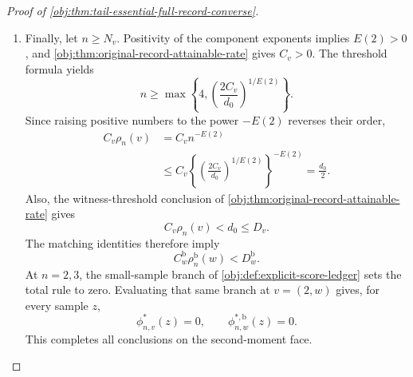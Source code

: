 \documentclass[11pt]{article}
\begin{document}
\begin{proof}[Proof of \cref{obj:thm:tail-essential-full-record-converse}]
\begin{enumerate}
\item
Finally, let \(n\ge N_v\). Positivity of the component exponents implies
\(E(2)>0\), and
\cref{obj:thm:original-record-attainable-rate} gives \(C_v>0\).
The threshold formula yields
\[
n\ge
\max\left\{4,\left(\frac{2C_v}{d_0}\right)^{1/E(2)}\right\}.
\]
Since raising positive numbers to the power \(-E(2)\) reverses their
order,
\[
\begin{aligned}
C_v\rho_n(v)
&=C_vn^{-E(2)}\\
&\le
C_v\left\{
\left(\frac{2C_v}{d_0}\right)^{1/E(2)}
\right\}^{-E(2)}
=\frac{d_0}{2}.
\end{aligned}
\]
Also, the witness-threshold conclusion of
\cref{obj:thm:original-record-attainable-rate} gives
\[
C_v\rho_n(v)<d_0\le D_v.
\]
The matching identities therefore imply
\[
C_w^{\mathrm b}\rho_n^{\mathrm b}(w)<D_w^{\mathrm b}.
\]
At \(n=2,3\), the small-sample branch of
\cref{obj:def:explicit-score-ledger} sets the total rule to zero.
Evaluating that same branch at \(v=(2,w)\) gives, for every sample \(z\),
\[
\phi^*_{n,v}(z)=0,\qquad
\phi^{*,\mathrm b}_{n,w}(z)=0.
\]
This completes all conclusions on the second-moment face.
\end{enumerate}
\end{proof}
\end{document}
